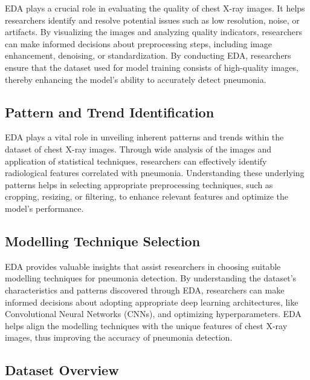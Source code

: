 \documentclass[9pt,twocolumn,twoside]{opticajnl}
\begin{document}
EDA plays a crucial role in evaluating the quality of chest X-ray images. It helps researchers identify and resolve potential issues such as low resolution, noise, or artifacts. By visualizing the images and analyzing quality indicators, researchers can make informed decisions about preprocessing steps, including image enhancement, denoising, or standardization. By conducting EDA, researchers ensure that the dataset used for model training consists of high-quality images, thereby enhancing the model's ability to accurately detect pneumonia.

\subsection{Pattern and Trend Identification}

EDA plays a vital role in unveiling inherent patterns and trends within the dataset of chest X-ray images. Through wide analysis of the images and application of statistical techniques, researchers can effectively identify radiological features correlated with pneumonia. Understanding these underlying patterns helps in selecting appropriate preprocessing techniques, such as cropping, resizing, or filtering, to enhance relevant features and optimize the model's performance.

\subsection{Modelling Technique Selection}

EDA provides valuable insights that assist researchers in choosing suitable modelling techniques for pneumonia detection. By understanding the dataset's characteristics and patterns discovered through EDA, researchers can make informed decisions about adopting appropriate deep learning architectures, like Convolutional Neural Networks (CNNs), and optimizing hyperparameters. EDA helps align the modelling techniques with the unique features of chest X-ray images, thus improving the accuracy of pneumonia detection.

\subsection{Dataset Overview}
\end{document}
